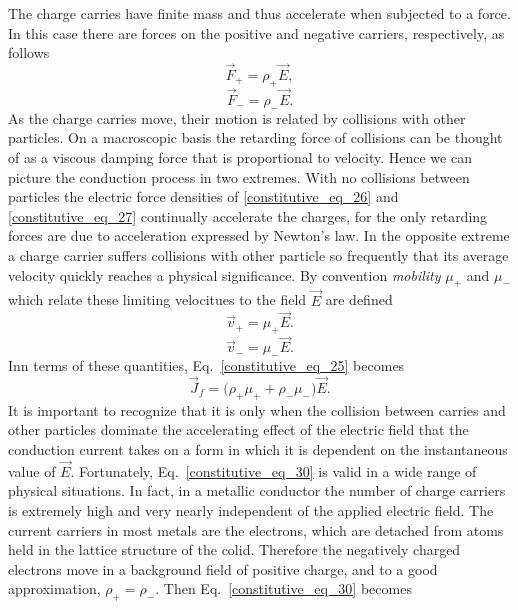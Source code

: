 \documentclass[12pt,a4paper,oneside]{book}
\begin{document}
\begin{onehalfspace}
The charge carries have finite mass and thus accelerate when subjected to a force. In this case there are forces on the positive and negative carriers, respectively, as follows
\begin{equation}\label{constitutive_eq_26}
	\vec{F}_{+}=\rho_{+}\vec{E},
\end{equation}
\begin{equation}\label{constitutive_eq_27}
	\vec{F}_{-}=\rho_{-}\vec{E}.
\end{equation}
As the charge carries move, their motion is related by collisions with other particles. On a macroscopic basis the retarding force of collisions can be thought of as a viscous damping force that is proportional to velocity. Hence we can picture the conduction process in two extremes. With no collisions between particles the electric force densities of \ref{constitutive_eq_26} and \ref{constitutive_eq_27} continually accelerate the charges, for the only retarding forces are due to acceleration expressed by Newton's law. In the opposite extreme a charge carrier suffers collisions with other particle so frequently that its average velocity quickly reaches a physical significance. By convention \textit{mobility} $\mu_{+}$ and $\mu_{-}$ which relate these limiting velocitues to the field $\vec{E}$ are defined
\begin{equation}\label{constitutive_eq_28}
	\vec{v}_{+}=\mu_{+}\vec{E}.
\end{equation}
\begin{equation}\label{constitutive_eq_29}
	\vec{v}_{-}=\mu_{-}\vec{E}.
\end{equation}
Inn terms of these quantities, Eq.~\eqref{constitutive_eq_25} becomes
\begin{equation}\label{constitutive_eq_30}
	\vec{J}_{f}=\big(\rho_{+}\mu_{+}+\rho_{-}\mu_{-}\big)\vec{E}.
\end{equation}
It is important to recognize that it is only when the collision between carries and other particles dominate the accelerating effect of the electric field that the conduction current takes on a form in which it is dependent on the instantaneous value of $\vec{E}$. Fortunately, Eq.~\eqref{constitutive_eq_30} is valid in a wide range of physical situations. In fact, in a metallic conductor the number of charge carriers is extremely high and very nearly independent of the applied electric field. The current carriers in most metals are the electrons, which are detached from atoms held in the lattice structure of the colid. Therefore the negatively charged electrons move in a background field of positive charge, and to a good approximation, $\rho_{+}=\rho_{-}$. Then Eq.~\eqref{constitutive_eq_30} becomes

\end{onehalfspace}
\end{document}
